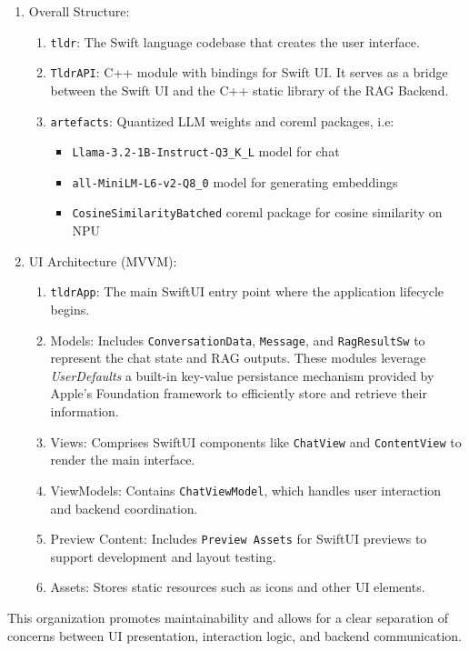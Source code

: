 \begin{enumerate}[label=\Alph*.]
    \item Overall Structure:
    \begin{enumerate}[label=\alph*.]
        \item \texttt{tldr}: The Swift language codebase that creates the user interface.
        \item \texttt{TldrAPI}: C++ module with bindings for Swift UI. It serves as a bridge between the Swift UI and the C++ static library of the RAG Backend.
    \item \texttt{artefacts}: Quantized LLM weights and coreml packages, i.e:
    \begin{itemize}
        \item \texttt{Llama-3.2-1B-Instruct-Q3\_K\_L} model for chat
        \item \texttt{all-MiniLM-L6-v2-Q8\_0} model for generating embeddings
        \item \texttt{CosineSimilarityBatched} coreml package for cosine similarity on NPU
    \end{itemize}
    \end{enumerate}

    \item UI Architecture (MVVM):
    \begin{enumerate}[label=\alph*.]
        \item \texttt{tldrApp}: The main SwiftUI entry point where the application lifecycle begins.
        \item Models: Includes \texttt{ConversationData}, \texttt{Message}, and \texttt{RagResultSw} to represent the chat state and RAG outputs. These modules leverage \textit{UserDefaults} a built-in key-value persistance mechanism provided by Apple's Foundation framework to efficiently store and retrieve their information.
        \item Views: Comprises SwiftUI components like \texttt{ChatView} and \texttt{ContentView} to render the main interface.
        \item ViewModels: Contains \texttt{ChatViewModel}, which handles user interaction and backend coordination.
        \item Preview Content: Includes \texttt{Preview Assets} for SwiftUI previews to support development and layout testing.
        \item Assets: Stores static resources such as icons and other UI elements.
    \end{enumerate}
\end{enumerate}
This organization promotes maintainability and allows for a clear separation of concerns between UI presentation, interaction logic, and backend communication.
